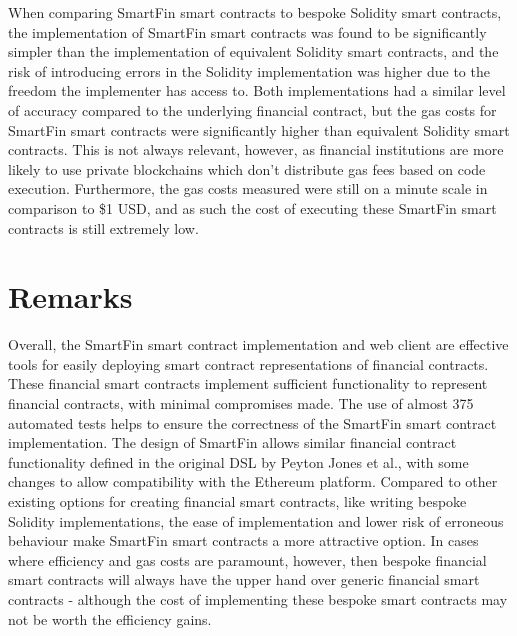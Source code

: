 When comparing SmartFin smart contracts to bespoke Solidity smart contracts, the implementation of SmartFin smart contracts was found to be significantly simpler than the implementation of equivalent Solidity smart contracts, and the risk of introducing errors in the Solidity implementation was higher due to the freedom the implementer has access to. Both implementations had a similar level of accuracy compared to the underlying financial contract, but the gas costs for SmartFin smart contracts were significantly higher than equivalent Solidity smart contracts. This is not always relevant, however, as financial institutions are more likely to use private blockchains which don't distribute gas fees based on code execution. Furthermore, the gas costs measured were still on a minute scale in comparison to \$1 USD, and as such the cost of executing these SmartFin smart contracts is still extremely low.


\section{Remarks}

Overall, the SmartFin smart contract implementation and web client are effective tools for easily deploying smart contract representations of financial contracts. These financial smart contracts implement sufficient functionality to represent financial contracts, with minimal compromises made. The use of almost 375 automated tests helps to ensure the correctness of the SmartFin smart contract implementation. The design of SmartFin allows similar financial contract functionality defined in the original DSL by Peyton Jones et al.\cite{SPJ}, with some changes to allow compatibility with the Ethereum platform. Compared to other existing options for creating financial smart contracts, like writing bespoke Solidity implementations, the ease of implementation and lower risk of erroneous behaviour make SmartFin smart contracts a more attractive option. In cases where efficiency and gas costs are paramount, however, then bespoke financial smart contracts will always have the upper hand over generic financial smart contracts - although the cost of implementing these bespoke smart contracts may not be worth the efficiency gains.
